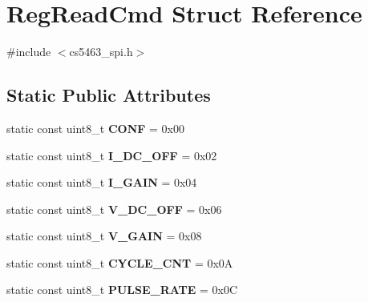 \hypertarget{structRegReadCmd}{\section{Reg\-Read\-Cmd Struct Reference}
\label{structRegReadCmd}
}


{\ttfamily \#include $<$cs5463\-\_\-spi.\-h$>$}

\subsection*{Static Public Attributes}
\begin{DoxyCompactItemize}
\item 
\hypertarget{structRegReadCmd_adb8d43d2f043bc11f9c573fb132d4a0f}{static const uint8\-\_\-t {\bfseries C\-O\-N\-F} = 0x00}\label{structRegReadCmd_adb8d43d2f043bc11f9c573fb132d4a0f}

\item 
\hypertarget{structRegReadCmd_ab22a2918bdd7f4dc27d1c6347b889e7b}{static const uint8\-\_\-t {\bfseries I\-\_\-\-D\-C\-\_\-\-O\-F\-F} = 0x02}\label{structRegReadCmd_ab22a2918bdd7f4dc27d1c6347b889e7b}

\item 
\hypertarget{structRegReadCmd_ad17e24efa81e98ec9f2fcd631ca91dfe}{static const uint8\-\_\-t {\bfseries I\-\_\-\-G\-A\-I\-N} = 0x04}\label{structRegReadCmd_ad17e24efa81e98ec9f2fcd631ca91dfe}

\item 
\hypertarget{structRegReadCmd_acb4395b2cee4dd5db2c8ab84368c5f69}{static const uint8\-\_\-t {\bfseries V\-\_\-\-D\-C\-\_\-\-O\-F\-F} = 0x06}\label{structRegReadCmd_acb4395b2cee4dd5db2c8ab84368c5f69}

\item 
\hypertarget{structRegReadCmd_ae6fb80bf7aec0bc7f3dba25fb2429dda}{static const uint8\-\_\-t {\bfseries V\-\_\-\-G\-A\-I\-N} = 0x08}\label{structRegReadCmd_ae6fb80bf7aec0bc7f3dba25fb2429dda}

\item 
\hypertarget{structRegReadCmd_aee7bc23bec4480bb1638cf2af169a302}{static const uint8\-\_\-t {\bfseries C\-Y\-C\-L\-E\-\_\-\-C\-N\-T} = 0x0\-A}\label{structRegReadCmd_aee7bc23bec4480bb1638cf2af169a302}

\item 
\hypertarget{structRegReadCmd_aac0af782ab00eada9bbd95e1e58cde28}{static const uint8\-\_\-t {\bfseries P\-U\-L\-S\-E\-\_\-\-R\-A\-T\-E} = 0x0\-C}\label{structRegReadCmd_aac0af782ab00eada9bbd95e1e58cde28}


\end{DoxyCompactItemize}
